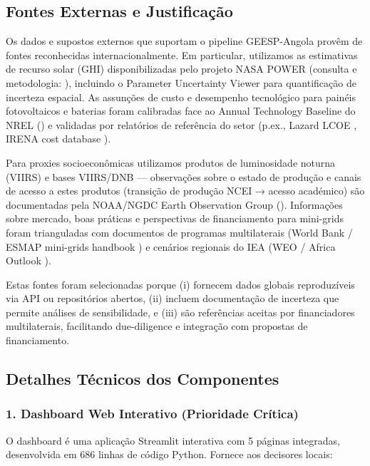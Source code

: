 \documentclass[12pt, a4paper]{article}
\begin{document}
\subsection{Fontes Externas e Justificação}

Os dados e supostos externos que suportam o pipeline GEESP-Angola provêm de fontes reconhecidas internacionalmente. Em particular, utilizamos as estimativas de recurso solar (GHI) disponibilizadas pelo projeto NASA POWER (consulta e metodologia: \citep{nasa_power}), incluindo o Parameter Uncertainty Viewer para quantificação de incerteza espacial. As assunções de custo e desempenho tecnológico para painéis fotovoltaicos e baterias foram calibradas face ao Annual Technology Baseline do NREL (\citep{NREL2024}) e validadas por relatórios de referência do setor (p.ex., Lazard LCOE \citep{Lazard2023}, IRENA cost database \citep{IRENA2024}).

Para proxies socioeconômicas utilizamos produtos de luminosidade noturna (VIIRS) e bases VIIRS/DNB — observações sobre o estado de produção e canais de acesso a estes produtos (transição de produção NCEI → acesso académico) são documentadas pela NOAA/NGDC Earth Observation Group (\citep{NOAA_VIIRS_2019}). Informações sobre mercado, boas práticas e perspectivas de financiamento para mini-grids foram trianguladas com documentos de programas multilaterais (World Bank / ESMAP mini-grids handbook \citep{WorldBankESMAP2024}) e cenários regionais do IEA (WEO / Africa Outlook \citep{IEA2024}).

Estas fontes foram selecionadas porque (i) fornecem dados globais reproduzíveis via API ou repositórios abertos, (ii) incluem documentação de incerteza que permite análises de sensibilidade, e (iii) são referências aceitas por financiadores multilaterais, facilitando due-diligence e integração com propostas de financiamento.

\subsection{Detalhes Técnicos dos Componentes}

\subsubsection{1. Dashboard Web Interativo (Prioridade Crítica)}

O dashboard é uma aplicação Streamlit interativa com 5 páginas integradas, desenvolvida em 686 linhas de código Python. Fornece aos decisores locais:
\end{document}
